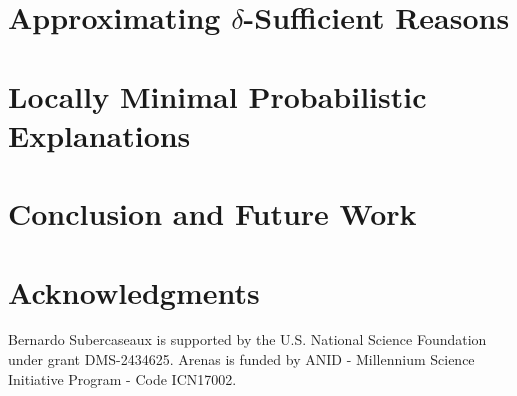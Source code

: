 \documentclass[letterpaper]{article} %
\begin{document}
\section{Approximating $\delta$-Sufficient Reasons}
\label{sec-comp-problem}


\section{Locally Minimal Probabilistic Explanations}
\label{sec-loc-min}


\section{Conclusion and Future Work}
\label{sec-conclusions}


\section*{Acknowledgments}
Bernardo Subercaseaux is supported by the U.S. National Science Foundation under grant DMS-2434625.
Arenas is funded by ANID - Millennium Science Initiative Program - Code ICN17002.




% 
\end{document}
